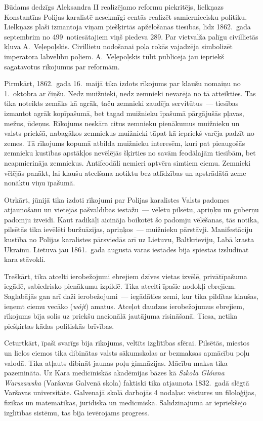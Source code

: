 \documentclass[twoside,a5paper,12pt,fleqn,openany]{extbook}
\newcommand{\pltxti}[1]{\textit{\textpolish{#1}}}
\begin{document}
Būdams dedzīgs Aleksandra II realizējamo reformu piekritējs, lielkņazs Konstantīns Polijas karalistē nesekmīgi centās realizēt samierniecisku politiku. Lielkņazs plaši izmantoja viņam piešķirtās apžēlošanas tiesības, līdz 1862.~gada septembrim no 499~notiesātajiem viņš piedeva 289. Par vietvalža palīgu civillietās kļuva A.~Veļepoļskis. Civillietu nodošanai poļa rokās vajadzēja simbolizēt imperatora labvēlību poļiem. A.~Veļepoļskis tūlīt publicēja jau iepriekš sagatavotus rīkojumus par reformām.

Pirmkārt, 1862.~gada 16.~maijā tika izdots rīkojums par klaušu nomaiņu no 1.~oktobra ar čiņšu. Nedz muižnieki, nedz zemnieki nevarēja no tā atteikties. Tas tika noteikts zemāks kā agrāk, taču zemnieki zaudēja servitūtus~--- tiesības izmantot agrāk kopīpašumā, bet tagad muižnieku īpašumā pārgājušās pļavas, mežus, ūdeņus. Rīkojums neskāra citus zemnieku pienākumus muižnieku un valsts priekšā, nabagākos zemniekus muižnieki tāpat kā iepriekš varēja padzīt no zemes. Tā rīkojums kopumā atbilda muižnieku interesēm, kuri pat pieaugošās zemnieku kustības apstākļos nevēlējās šķirties no savām feodālajām tiesībām, bet neapmierināja zemniekus. Antifeodāli nemieri aptvēra simtiem ciemu. Zemnieki vēlējās panākt, lai klaušu atcelšana notiktu bez atlīdzības un apstrādātā zeme nonāktu viņu īpašumā.

Otrkārt, jūnijā tika izdoti rīkojumi par Polijas karalistes Valsts padomes atjaunošanu un vietējās pašvaldības iestāžu~--- vēlētu pilsētu, apriņķu un guberņu padomju izveidi. Kaut radikāļi aicināja boikotēt šo padomju vēlēšanas, tās notika, pilsētās tika ievēlēti buržuāzijas, apriņķos~--- muižnieku pārstāvji. Manifestāciju kustība no Polijas karalistes pārsviedās arī uz Lietuvu, Baltkrieviju, Labā krasta Ukrainu. Lietuvā jau 1861.~gada augustā varas iestādes bija spiestas izsludināt kara stāvokli.

Treškārt, tika atcelti ierobežojumi ebrejiem dzīves vietas izvēlē, privātīpašuma iegādē, sabiedrisko pienākumu izpildē. Tika atcelti īpašie nodokļi ebrejiem. Saglabājās gan arī daži ierobežojumi~--- iegādāties zemi, kur tika pildītas klaušas, ieņemt ciemu vecāko (\pltxti{wójt}) amatus. Atceļot daudzos ierobežojumus ebrejiem, rīkojums bija solis uz priekšu nacionālā jautājuma risināšanā. Tiesa, netika piešķirtas kādas politiskās brīvības.

Ceturtkārt, īpaši svarīgs bija rīkojums, veltīts izglītības sfērai. Pilsētās, miestos un lielos ciemos tika dibinātas valsts sākumskolas ar bezmaksas apmācību poļu valodā. Tika atļauts dibināt jaunas poļu ģimnāzijas. Mācību maksa tika pazemināta. Uz Kara medicīniskās akadēmijas bāzes kā \pltxti{Szkoła Główna Warszawska} (Varšavas Galvenā skola) faktiski tika atjaunota 1832.~gadā slēgtā Varšavas universitāte. Galvenajā skolā darbojās 4 nodaļas: vēstures un filoloģijas, fizikas un matemātikas, juridiskā un medicīniskā. Salīdzinājumā ar iepriekšējo izglītības sistēmu, tas bija ievērojams progress.
\end{document}
